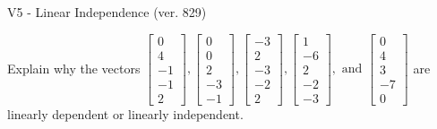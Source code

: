\begin{exercise}
  \begin{exerciseTitle}V5 - Linear Independence (ver. 829)\end{exerciseTitle}
  \begin{exerciseStatement}
    Explain why the vectors \(\left[\begin{array}{r}
0 \\
4 \\
-1 \\
-1 \\
2
\end{array}\right] , \left[\begin{array}{r}
0 \\
0 \\
2 \\
-3 \\
-1
\end{array}\right] , \left[\begin{array}{r}
-3 \\
2 \\
-3 \\
-2 \\
2
\end{array}\right] , \left[\begin{array}{r}
1 \\
-6 \\
2 \\
-2 \\
-3
\end{array}\right] , \text{ and } \left[\begin{array}{r}
0 \\
4 \\
3 \\
-7 \\
0
\end{array}\right]\) are linearly dependent or linearly independent.	



\end{exerciseStatement}
\end{exercise}
